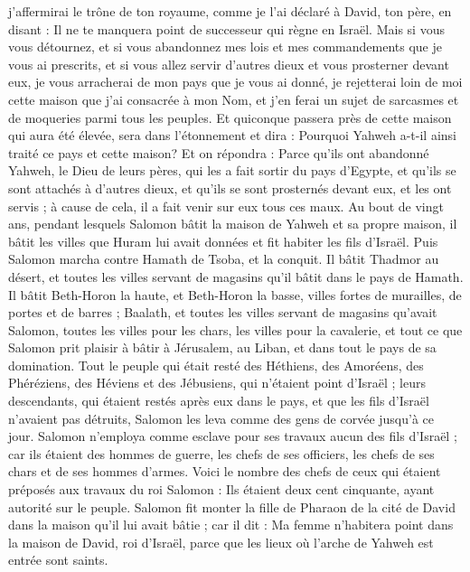 \begin{multicols}{2}
j'affermirai le trône de ton royaume, comme je l'ai déclaré à David, ton père, en disant : Il ne te manquera point de successeur qui règne en Israël.
Mais si vous vous détournez, et si vous abandonnez mes lois et mes commandements que je vous ai prescrits, et si vous allez servir d'autres dieux et vous prosterner devant eux,
je vous arracherai de mon pays que je vous ai donné, je rejetterai loin de moi cette maison que j'ai consacrée à mon Nom, et j'en ferai un sujet de sarcasmes et de moqueries parmi tous les peuples.
Et quiconque passera près de cette maison qui aura été élevée, sera dans l'étonnement et dira : Pourquoi Yahweh a-t-il ainsi traité ce pays et cette maison?
Et on répondra : Parce qu'ils ont abandonné Yahweh, le Dieu de leurs pères, qui les a fait sortir du pays d'Egypte, et qu'ils se sont attachés à d'autres dieux, et qu'ils se sont prosternés devant eux, et les ont servis ; à cause de cela, il a fait venir sur eux tous ces maux.
\VerseOne{}Au bout de vingt ans, pendant lesquels Salomon bâtit la maison de Yahweh et sa propre maison,
il bâtit les villes que Huram lui avait données et fit habiter les fils d'Israël.
Puis Salomon marcha contre Hamath de Tsoba, et la conquit.
Il bâtit Thadmor au désert, et toutes les villes servant de magasins qu'il bâtit dans le pays de Hamath.
Il bâtit Beth-Horon la haute, et Beth-Horon la basse, villes fortes de murailles, de portes et de barres ;
Baalath, et toutes les villes servant de magasins qu'avait Salomon, toutes les villes pour les chars, les villes pour la cavalerie, et tout ce que Salomon prit plaisir à bâtir à Jérusalem, au Liban, et dans tout le pays de sa domination.
Tout le peuple qui était resté des Héthiens, des Amoréens, des Phéréziens, des Héviens et des Jébusiens, qui n'étaient point d'Israël ;
leurs descendants, qui étaient restés après eux dans le pays, et que les fils d'Israël n'avaient pas détruits, Salomon les leva comme des gens de corvée jusqu'à ce jour.
Salomon n'employa comme esclave pour ses travaux aucun des fils d'Israël ; car ils étaient des hommes de guerre, les chefs de ses officiers, les chefs de ses chars et de ses hommes d'armes.
Voici le nombre des chefs de ceux qui étaient préposés aux travaux du roi Salomon : Ils étaient deux cent cinquante, ayant autorité sur le peuple.
Salomon fit monter la fille de Pharaon de la cité de David dans la maison qu'il lui avait bâtie ; car il dit : Ma femme n'habitera point dans la maison de David, roi d'Israël, parce que les lieux où l'arche de Yahweh est entrée sont saints.

\end{multicols}

